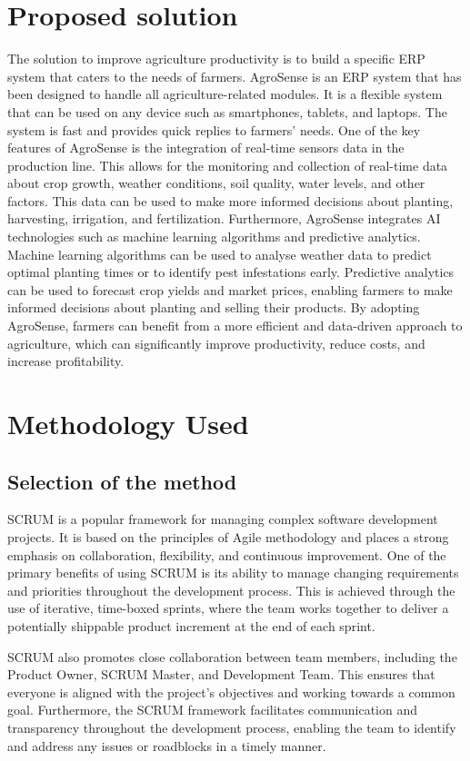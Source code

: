\section{Proposed solution}
The solution to improve agriculture productivity is to build a specific ERP system that caters to the needs of farmers. AgroSense is an ERP system that has been designed to handle all agriculture-related modules. It is a flexible system that can be used on any device such as smartphones, tablets, and laptops. The system is fast and provides quick replies to farmers' needs. One of the key features of AgroSense is the integration of real-time sensors data in the production line. This allows for the monitoring and collection of real-time data about crop growth, weather conditions, soil quality, water levels, and other factors. This data can be used to make more informed decisions about planting, harvesting, irrigation, and fertilization. Furthermore, AgroSense integrates AI technologies such as machine learning algorithms and predictive analytics. Machine learning algorithms can be used to analyse weather data to predict optimal planting times or to identify pest infestations early. Predictive analytics can be used to forecast crop yields and market prices, enabling farmers to make informed decisions about planting and selling their products. By adopting AgroSense, farmers can benefit from a more efficient and data-driven approach to agriculture, which can significantly improve productivity, reduce costs, and increase profitability.
\section{Methodology Used}

\subsection{Selection of the method}

SCRUM is a popular framework for managing complex software development projects. It is based on the principles of Agile methodology and places a strong emphasis on collaboration, flexibility, and continuous improvement. One of the primary benefits of using SCRUM is its ability to manage changing requirements and priorities throughout the development process. This is achieved through the use of iterative, time-boxed sprints, where the team works together to deliver a potentially shippable product increment at the end of each sprint.

SCRUM also promotes close collaboration between team members, including the Product Owner, SCRUM Master, and Development Team. This ensures that everyone is aligned with the project's objectives and working towards a common goal. Furthermore, the SCRUM framework facilitates communication and transparency throughout the development process, enabling the team to identify and address any issues or roadblocks in a timely manner.

